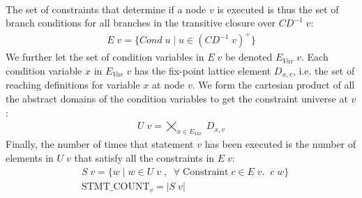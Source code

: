\documentclass[a4paper]{article}
\newcommand{\NL}[0]{ \hfill\\\noindent }
\begin{document}
\NL
The set of constraints that determine if a node $v$ is executed is thus the set of branch conditions for all branches in the transitive closure over $CD^{-1}\;v$:
\begin{align*}
E\;v = \{ Cond\;u\;|\;u \in (CD^{-1}\;v)^{+} \}
\end{align*}
\noindent
We further let the set of condition variables in $E\;v$ be denoted $E_{Var}\;v$. Each condition variable $x$ in $E_{Var}\;v$ has the fix-point lattice element $D_{x,v}$, i.e. the set of reaching definitions for variable $x$ at node $v$. We form the cartesian product of all the abstract domains of the condition variables to get the constraint universe at $v$:
\begin{align*}
U\;v = \bigtimes_{ x \in E_{Var}\;} D_{x,v}
\end{align*}
\noindent
Finally, the number of times that statement $v$ has been executed is the number of elements in $U\;v$ that satisfy all the constraints in $E\;v$:
\begin{align*}
&S\;v = \{ w \;|\; w \in U\;v\;, \;\; \forall\; \text{Constraint} \; c \in E\;v. \;\; c\;w\}\\
&\text{STMT\_COUNT}_v = |S\;v|
\end{align*}
\end{document}
